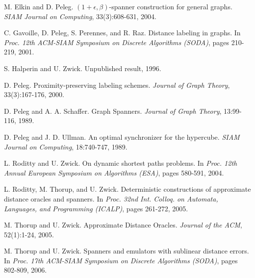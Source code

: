 \documentclass[a4paper,11pt]{article}
\theoremstyle{definition}
\begin{document}
\begin{thebibliography}{20}
M. Elkin and D. Peleg.
$(1 + \epsilon, \beta)$-spanner construction for general  graphs.
{\em SIAM Journal on Computing}, 33(3):608-631, 2004.

C. Gavoille, D. Peleg, S. Perennes, and R. Raz.
Distance labeling in graphs.
In {\em Proc. 12th ACM-SIAM Symposium on Discrete Algorithms (SODA)}, pages 210-219, 2001.


S. Halperin and U. Zwick.
Unpublished result, 1996.

D. Peleg.
Proximity-preserving labeling schemes.
{\em Journal of Graph Theory}, 33(3):167-176, 2000.


D. Peleg and A. A. Schaffer.
Graph Spanners.
{\em Journal of Graph Theory}, 13:99-116, 1989.

D. Peleg and J. D. Ullman.
An optimal synchronizer for the hypercube.
{\em SIAM Journal on Computing}, 18:740-747, 1989.

L. Roditty and U. Zwick.
On dynamic shortest paths problems.
In {\em Proc. 12th Annual European Symposium on Algorithms (ESA)}, pages 580-591, 2004.


L. Roditty, M. Thorup, and U. Zwick.
Deterministic constructions of approximate distance oracles and spanners.
In {\em Proc. 32nd Int. Colloq. on Automata, Languages, and Programming (ICALP)}, pages 261-272, 2005.

M. Thorup and U. Zwick.
Approximate Distance Oracles.
{\em Journal of the ACM}, 52(1):1-24, 2005.


M. Thorup and U. Zwick.
Spanners and emulators with sublinear distance errors.
In {\em Proc. 17th ACM-SIAM Symposium on Discrete Algorithms (SODA)}, pages 802-809, 2006.


\end{thebibliography}
\end{document}
